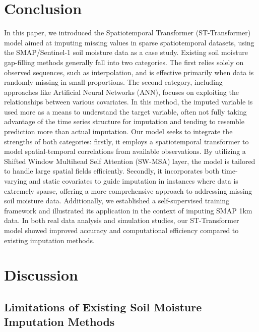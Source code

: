 \documentclass[11pt]{article}
\begin{document}




\section{Conclusion}
In this paper, we introduced the Spatiotemporal Transformer (ST-Transformer) model aimed at imputing missing values in sparse spatiotemporal datasets, using the SMAP/Sentinel-1 soil moisture data as a case study. Existing soil moisture gap-filling methods generally fall into two categories. The first relies solely on observed sequences, such as interpolation, and is effective primarily when data is randomly missing in small proportions. The second category, including approaches like Artificial Neural Networks (ANN), focuses on exploiting the relationships between various covariates. In this method, the imputed variable is used more as a means to understand the target variable, often not fully taking advantage of the time series structure for imputation and tending to resemble prediction more than actual imputation. Our model seeks to integrate the strengths of both categories: firstly, it employs a spatiotemporal transformer to model spatial-temporal correlations from available observations. By utilizing a Shifted Window Multihead Self Attention (SW-MSA) layer, the model is tailored to handle large spatial fields efficiently. Secondly, it incorporates both time-varying and static covariates to guide imputation in instances where data is extremely sparse, offering a more comprehensive approach to addressing missing soil moisture data. Additionally, we established a self-supervised training framework and illustrated its application in the context of imputing SMAP 1km data. In both real data analysis and simulation studies, our ST-Transformer model showed improved accuracy and computational efficiency compared to existing imputation methods. 







\section{Discussion}

\subsection{Limitations of Existing Soil Moisture Imputation Methods}
\end{document}

